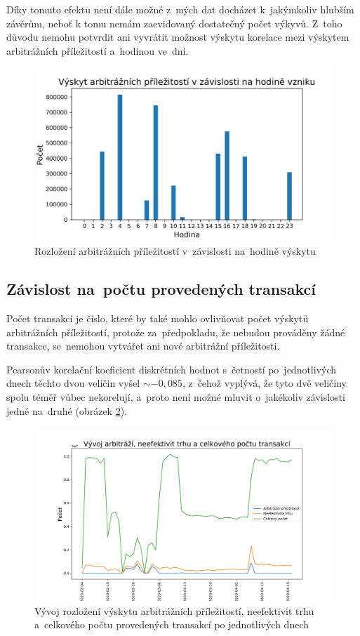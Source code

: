 \documentclass[thesis=B,czech]{FITthesis}[2019/03/21]
\begin{document}
Díky tomuto efektu není dále možné z~mých dat docházet k~jakýmkoliv hlubším závěrům, neboť k tomu nemám zaevidovaný dostatečný počet výkyvů. Z~toho důvodu nemohu potvrdit ani vyvrátit možnost výskytu korelace mezi výskytem arbitrážních příležitostí a~hodinou ve~dni.

\begin{figure}\centering
	\includegraphics[width=1\textwidth]{images/hours_distribution.png}
	\caption{Rozložení arbitrážních příležitostí v~závislosti na~hodině výskytu }\label{hours_distribution}
\end{figure}
\subsection{Závislost na~počtu provedených transakcí}
Počet transakcí je číslo, které by také mohlo ovlivňovat počet výskytů arbitrážních příležitostí, protože za~předpokladu, že nebudou prováděny žádné transakce, se~nemohou vytvářet ani nové arbitrážní příležitosti.

Pearsonův korelační koeficient diskrétních hodnot s~četností po~jednotlivých dnech těchto dvou veličin vyšel \(\sim-0,085\), z~čehož vyplývá, že tyto dvě veličiny spolu téměř vůbec nekorelují, a~proto není možné mluvit o~jakékoliv závislosti jedné na~druhé (obrázek \ref{occurence_correlation}).

\begin{figure}\centering
	\includegraphics[width=1\textwidth]{images/occurence_correlation.png}
	\caption{Vývoj rozložení výskytu arbitrážních příležitostí, neefektivit trhu a~celkového počtu provedených transakcí po jednotlivých dnech}\label{occurence_correlation}
\end{figure}
\end{document}
